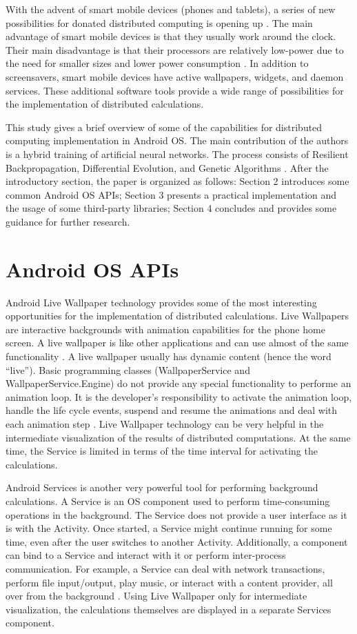 \documentclass[a4paper,conference]{IEEEtran}
\begin{document}
With the advent of smart mobile devices (phones and tablets), a series of new possibilities for donated distributed computing is opening up \cite{Tapparello-01}. The main advantage of smart mobile devices is that they usually work around the clock. Their main disadvantage is that their processors are relatively low-power due to the need for smaller sizes and lower power consumption \cite{Chinara-01}. In addition to screensavers, smart mobile devices have active wallpapers, widgets, and daemon services. These additional software tools provide a wide range of possibilities for the implementation of distributed calculations. 

This study gives a brief overview of some of the capabilities for distributed computing implementation in Android OS. The main contribution of the authors is a hybrid training of artificial neural networks. The process consists of Resilient Backpropagation, Differential Evolution, and Genetic Algorithms \cite{Balabanov-01}. After the introductory section, the paper is organized as follows: Section 2 introduces some common Android OS APIs; Section 3 presents a practical implementation and the usage of some third-party libraries; Section 4 concludes and provides some guidance for further research. 

\section{Android OS APIs}

Android Live Wallpaper technology provides some of the most interesting opportunities for the implementation of distributed calculations. Live Wallpapers are interactive backgrounds with animation capabilities for the phone home screen. A live wallpaper is like other applications and can use almost of the same functionality \cite{Vogel-01}. A live wallpaper usually has dynamic content (hence the word “live”). Basic programming classes (WallpaperService and WallpaperService.Engine) do not provide any special functionality to performe an animation loop. It is the developer's responsibility to activate the animation loop, handle the life cycle events, suspend and resume the animations and deal with each animation step \cite{Grouchnikov-01}. Live Wallpaper technology can be very helpful in the intermediate visualization of the results of distributed computations. At the same time, the Service is limited in terms of the time interval for activating the calculations. 

Android Services is another very powerful tool for performing background calculations. A Service is an OS component used to perform time-consuming operations in the background. The Service does not provide a user interface as it is with the Activity. Once started, a Service might continue running for some time, even after the user switches to another Activity. Additionally, a component can bind to a Service and interact with it or perform inter-process communication. For example, a Service can deal with network transactions, perform file input/output, play music, or interact with a content provider, all over from the background \cite{Google-01}. Using Live Wallpaper only for intermediate visualization, the calculations themselves are displayed in a separate Services component. 
\end{document}
